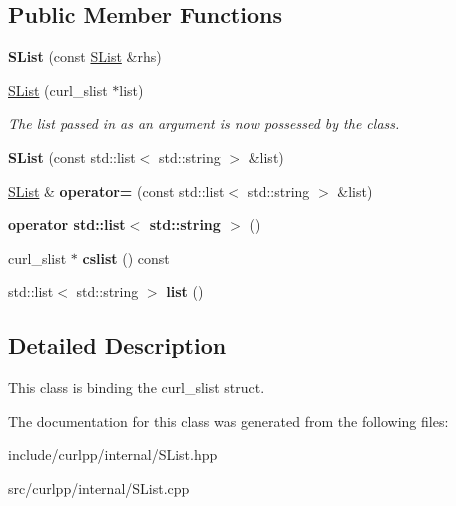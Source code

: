 \subsection*{Public Member Functions}
\begin{DoxyCompactItemize}
\item 
\hypertarget{classcurlpp_1_1internal_1_1SList_a6f517dfaad063c8ff38c51c3ac088fb7}{{\bfseries S\-List} (const \hyperlink{classcurlpp_1_1internal_1_1SList}{S\-List} \&rhs)}\label{classcurlpp_1_1internal_1_1SList_a6f517dfaad063c8ff38c51c3ac088fb7}

\item 
\hypertarget{classcurlpp_1_1internal_1_1SList_a6a5f4975c0830dddc7d7ddf4b56d6f39}{\hyperlink{classcurlpp_1_1internal_1_1SList_a6a5f4975c0830dddc7d7ddf4b56d6f39}{S\-List} (curl\-\_\-slist $\ast$list)}\label{classcurlpp_1_1internal_1_1SList_a6a5f4975c0830dddc7d7ddf4b56d6f39}

\begin{DoxyCompactList}\small\item\em The list passed in as an argument is now possessed by the class. \end{DoxyCompactList}\item 
\hypertarget{classcurlpp_1_1internal_1_1SList_a1e12892db86c6c88430ed35a1a91aef6}{{\bfseries S\-List} (const std\-::list$<$ std\-::string $>$ \&list)}\label{classcurlpp_1_1internal_1_1SList_a1e12892db86c6c88430ed35a1a91aef6}

\item 
\hypertarget{classcurlpp_1_1internal_1_1SList_a34ef6b2d8444ccacd95b80eefb66b4b1}{\hyperlink{classcurlpp_1_1internal_1_1SList}{S\-List} \& {\bfseries operator=} (const std\-::list$<$ std\-::string $>$ \&list)}\label{classcurlpp_1_1internal_1_1SList_a34ef6b2d8444ccacd95b80eefb66b4b1}

\item 
\hypertarget{classcurlpp_1_1internal_1_1SList_ae95a87cd64361c2aa1948422c52a9c12}{{\bfseries operator std\-::list$<$ std\-::string $>$} ()}\label{classcurlpp_1_1internal_1_1SList_ae95a87cd64361c2aa1948422c52a9c12}

\item 
\hypertarget{classcurlpp_1_1internal_1_1SList_aaccbb1f36aa1b5ef05d88d03cc76e863}{curl\-\_\-slist $\ast$ {\bfseries cslist} () const }\label{classcurlpp_1_1internal_1_1SList_aaccbb1f36aa1b5ef05d88d03cc76e863}

\item 
\hypertarget{classcurlpp_1_1internal_1_1SList_a0e6848e9cb9f5d7a4d24b9cba1ca59df}{std\-::list$<$ std\-::string $>$ {\bfseries list} ()}\label{classcurlpp_1_1internal_1_1SList_a0e6848e9cb9f5d7a4d24b9cba1ca59df}

\end{DoxyCompactItemize}


\subsection{Detailed Description}
This class is binding the curl\-\_\-slist struct. 

The documentation for this class was generated from the following files\-:\begin{DoxyCompactItemize}
\item 
include/curlpp/internal/S\-List.\-hpp\item 
src/curlpp/internal/S\-List.\-cpp\end{DoxyCompactItemize}
